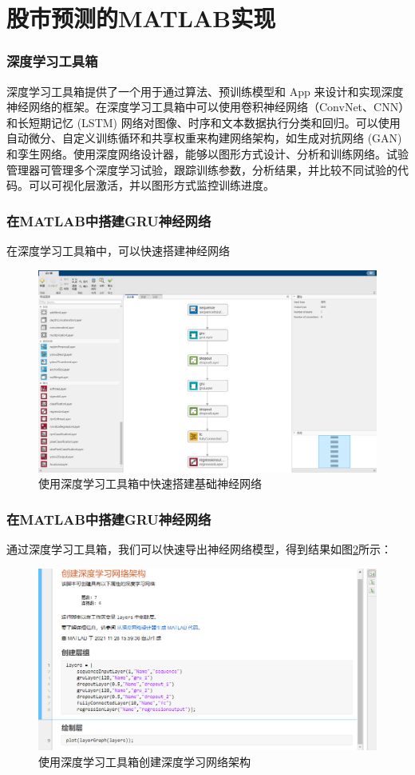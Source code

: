 \documentclass[aspectratio=169, 10pt, utf8, mathserif]{beamer}
\begin{document}
\section{股市预测的MATLAB实现}
\begin{frame}
	\frametitle{深度学习工具箱}
	深度学习工具箱提供了一个用于通过算法、预训练模型和 App 来设计和实现深度神经网络的框架。在深度学习工具箱中可以使用卷积神经网络（ConvNet、CNN）和长短期记忆 (LSTM) 网络对图像、时序和文本数据执行分类和回归。可以使用自动微分、自定义训练循环和共享权重来构建网络架构，如生成对抗网络 (GAN) 和孪生网络。使用深度网络设计器，能够以图形方式设计、分析和训练网络。试验管理器可管理多个深度学习试验，跟踪训练参数，分析结果，并比较不同试验的代码。可以可视化层激活，并以图形方式监控训练进度。
\end{frame}	
\begin{frame}
	\frametitle{在MATLAB中搭建GRU神经网络}
	在深度学习工具箱中，可以快速搭建神经网络
	\begin{figure}[H]
		\centering
		\includegraphics[width=0.7\linewidth]{pic/screenshot018}
		\caption{使用深度学习工具箱中快速搭建基础神经网络}
		\label{fig:screenshot017}
	\end{figure}
\end{frame}	
\begin{frame}
	\frametitle{在MATLAB中搭建GRU神经网络}
	通过深度学习工具箱，我们可以快速导出神经网络模型，得到结果如图\ref{fig:screenshot019}所示：
	\begin{figure}[H]
		\centering
		\includegraphics[width=0.6\linewidth]{pic/screenshot019}
		\caption{使用深度学习工具箱创建深度学习网络架构}
		\label{fig:screenshot019}
	\end{figure}
\end{frame}	
\end{document}
